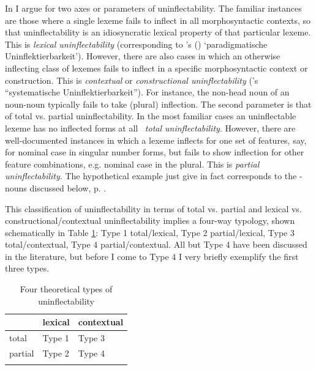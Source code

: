 \documentclass[output=paper,colorlinks,citecolor=brown]{langscibook}
\begin{document}
In \citet{spencer2020} I argue for two axes or parameters of uninflectability. The familiar instances are those where a single lexeme fails to inflect in all morphosyntactic contexts, so that uninflectability is an idiosyncratic lexical property of that particular lexeme. This is \emph{lexical uninflectability} (corresponding to \citeauthor{doleschal2001}'s (\citeyear{doleschal2001}) `paradigmatische Uninflektierbarkeit'). However, there are also cases in which an otherwise inflecting class of lexemes fails to inflect in a specific morphosyntactic context or construction. This is \emph{contextual} or \emph{constructional uninflectability} (\citeauthor{doleschal2001}'s \citeyear{doleschal2001} ``systematische Uninflektierbarkeit'').  For instance, the non-head noun of an  noun-noun  typically fails to take (plural) inflection. The second parameter is that of total vs. partial uninflectability. In the most familiar cases an uninflectable lexeme has no inflected forms at all \textendash\ \emph{total uninflectability}. However, there are well-documented instances in which a lexeme inflects for one set of features, say, for nominal case in singular number forms, but fails to show inflection for other feature combinations, e.g. nominal case in the plural. This is \emph{partial uninflectability}. The hypothetical example just give in fact corresponds to the  -nouns discussed below, p. \pageref{muzeum}.

This classification of uninflectability in terms of total vs. partial and lexical vs. constructional/contextual uninflectability implies a four-way typology, shown schematically in Table \ref{tab:fourtypes}: Type 1 total/lexical, Type 2 partial/lexical, Type 3 total/contextual, Type 4 partial/contextual.   %
All but Type 4 have been discussed in the literature, but before I come to Type 4 I very briefly exemplify  the first three types.

\begin{table}[ht]
	\centering
	
	\begin{tabular}{lll}
		\lsptoprule
		& lexical & contextual\is{uninflectability!contextual} \\
		\midrule
		total\is{uninflectability!total} & Type 1 & Type 3	\\
		partial\is{uninflectability!partial} & Type 2 & Type 4 \\
		\lspbottomrule
	\end{tabular}
	
	\caption{Four theoretical types of uninflectability}
	\label{tab:fourtypes}
\end{table}
\end{document}
